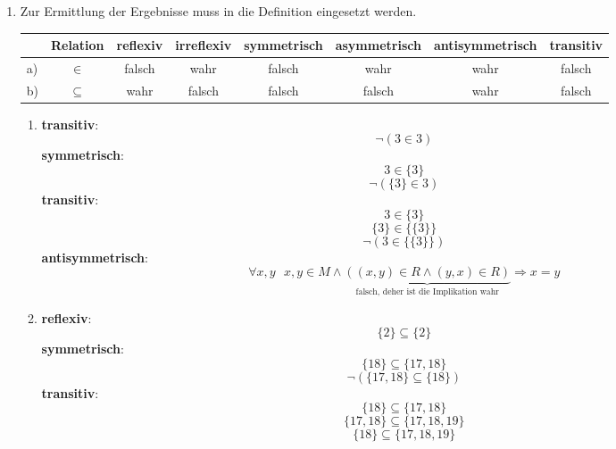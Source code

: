 \documentclass[a4paper]{article}
\begin{document}
\begin{enumerate}
		\item
		Zur Ermittlung der Ergebnisse muss in die Definition eingesetzt werden.
		\newline
		\begin{tabular}{|l|c|c|c|c|c|c|c|}
			\firsthline
				& Relation & reflexiv & irreflexiv & symmetrisch & asymmetrisch & antisymmetrisch & transitiv \\
			\hline
				a) & $\in$ & falsch & wahr & falsch & wahr & wahr & falsch \\
			\hline
				b) & $\subseteq$ & wahr & falsch & falsch & falsch & wahr & falsch \\
			\hline
		\end{tabular}
		\newline
		\begin{enumerate}
			\item
			\textbf{transitiv}:
			\begin{equation*}
				\lnot (3 \in 3)
			\end{equation*}
			\textbf{symmetrisch}:
			\begin{equation*}
				3 \in \{3\}
			\end{equation*}
			\begin{equation*}
				\lnot (\{3\} \in 3)
			\end{equation*}
			\clearpage
			\textbf{transitiv}:
			\begin{equation*}
				3 \in \{3\}
			\end{equation*}
			\begin{equation*}
				\{3\} \in \{\{3\}\}
			\end{equation*}
			\begin{equation*}
				\lnot (3 \in \{\{3\}\})
			\end{equation*}
			\textbf{antisymmetrisch}:
			\begin{equation*}
				\forall x, y \text{ } x, y \in M \land \underbrace{((x, y) \in R \land (y, x) \in R)}_{\text{falsch, deher ist die Implikation wahr}} \Rightarrow x = y
			\end{equation*}
			
			\item
			\textbf{reflexiv}:
			\begin{equation*}
				\{2\} \subseteq \{2\}
			\end{equation*}
			\textbf{symmetrisch}:
			\begin{equation*}
				\{18\} \subseteq \{17, 18\}
			\end{equation*}
			\begin{equation*}
				\lnot (\{17, 18\} \subseteq \{18\})
			\end{equation*}
			\textbf{transitiv}:
			\begin{equation*}
				\{18\} \subseteq \{17, 18\}
			\end{equation*}
			\begin{equation*}
				\{17, 18\} \subseteq \{17, 18, 19\}
			\end{equation*}
			\begin{equation*}
				\{18\} \subseteq \{17, 18, 19\}
			\end{equation*}
		\end{enumerate}
		

\end{enumerate}
\end{document}
